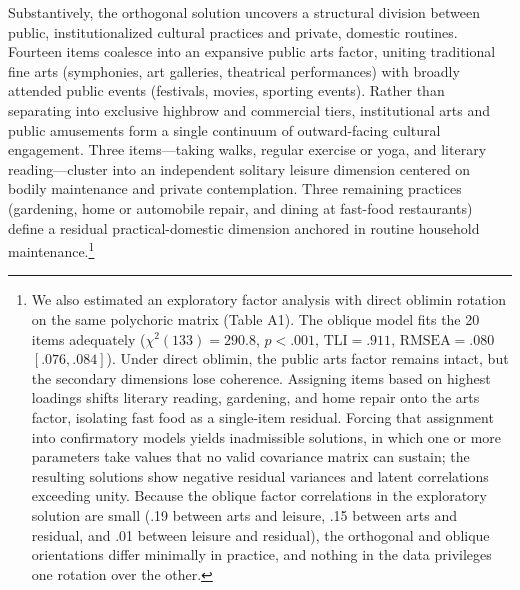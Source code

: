 \documentclass[
  12pt
]{article}
\begin{document}
Substantively, the orthogonal solution uncovers a structural division between public, institutionalized cultural practices and private, domestic routines. Fourteen items coalesce into an expansive public arts factor, uniting traditional fine arts (symphonies, art galleries, theatrical performances) with broadly attended public events (festivals, movies, sporting events). Rather than separating into exclusive highbrow and commercial tiers, institutional arts and public amusements form a single continuum of outward-facing cultural engagement. Three items---taking walks, regular exercise or yoga, and literary reading---cluster into an independent solitary leisure dimension centered on bodily maintenance and private contemplation. Three remaining practices (gardening, home or automobile repair, and dining at fast-food restaurants) define a residual practical-domestic dimension anchored in routine household maintenance.\footnote{We also estimated an exploratory factor analysis with direct oblimin rotation on the same polychoric matrix (Table A1). The oblique model fits the 20 items adequately ($\chi^2(133) = 290.8$, $p < .001$, $\text{TLI} = .911$, $\text{RMSEA} = .080$ $[.076, .084]$). Under direct oblimin, the public arts factor remains intact, but the secondary dimensions lose coherence. Assigning items based on highest loadings shifts literary reading, gardening, and home repair onto the arts factor, isolating fast food as a single-item residual. Forcing that assignment into confirmatory models yields inadmissible solutions, in which one or more parameters take values that no valid covariance matrix can sustain; the resulting solutions show negative residual variances and latent correlations exceeding unity. Because the oblique factor correlations in the exploratory solution are small (.19 between arts and leisure, .15 between arts and residual, and .01 between leisure and residual), the orthogonal and oblique orientations differ minimally in practice, and nothing in the data privileges one rotation over the other.}
\end{document}
